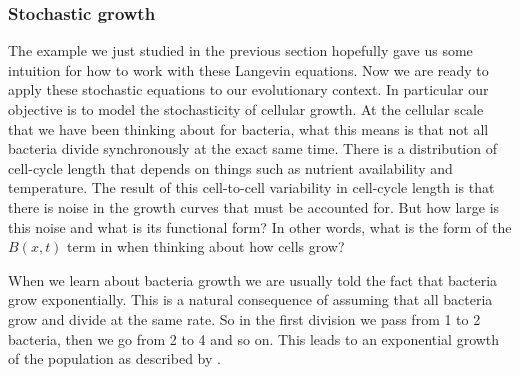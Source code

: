 \subsubsection{Stochastic growth}

The example we just studied in the previous section hopefully gave us some
intuition for how to work with these Langevin equations. Now we are ready to
apply these stochastic equations to our evolutionary context. In particular our
objective is to model the stochasticity of cellular growth. At the cellular
scale that we have been thinking about for bacteria, what this means is that
not all bacteria divide synchronously at the exact same time. There is a
distribution of cell-cycle length that depends on things such as nutrient
availability and temperature. The result of this cell-to-cell variability in
cell-cycle length is that there is noise in the growth curves that must be
accounted for. But how large is this noise and what is its functional form? In
other words, what is the form of the $B(x, t)$ term in  when
thinking about how cells grow?

When we learn about bacteria growth we are usually told the fact that bacteria 
grow exponentially. This is a natural consequence of assuming that all bacteria
grow and divide at the same rate. So in the first division we pass from 1 to 2
bacteria, then we go from 2 to 4 and so on. This leads to an exponential growth
of the population as described by .